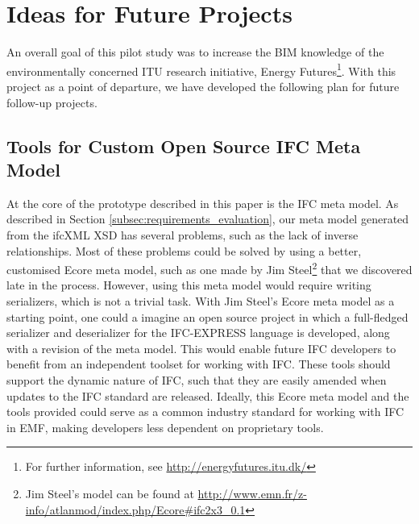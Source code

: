 
\section{Ideas for Future Projects}
\label{sec:plan_for_future_projects}
An overall goal of this pilot study was to increase the BIM knowledge of the environmentally concerned ITU research initiative, Energy Futures\footnote{For further information, see \url{http://energyfutures.itu.dk/}}. With this project as a point of departure, we have developed the following plan for future follow-up projects.

\subsection{Tools for Custom Open Source IFC Meta Model}
At the core of the prototype described in this paper is the IFC meta model. As described in Section \ref{subsec:requirements_evaluation}, our meta model generated from the ifcXML XSD has several problems, such as the lack of inverse relationships. Most of these problems could be solved by using a better, customised Ecore meta model, such as one made by Jim Steel\footnote{Jim Steel's model can be found at \url{http://www.emn.fr/z-info/atlanmod/index.php/Ecore#ifc2x3_0.1}} that we discovered late in the process. However, using this meta model would require writing serializers, which is not a trivial task. With Jim Steel's Ecore meta model as a starting point, one could a imagine an open source project in which a full-fledged serializer and deserializer for the IFC-EXPRESS language is developed, along with a revision of the meta model. This would enable future IFC developers to benefit from an independent toolset for working with IFC. These tools should support the dynamic nature of IFC, such that they are easily amended when updates to the IFC standard are released. Ideally, this Ecore meta model and the tools provided could serve as a common industry standard for working with IFC in EMF, making developers less dependent on proprietary tools. %

